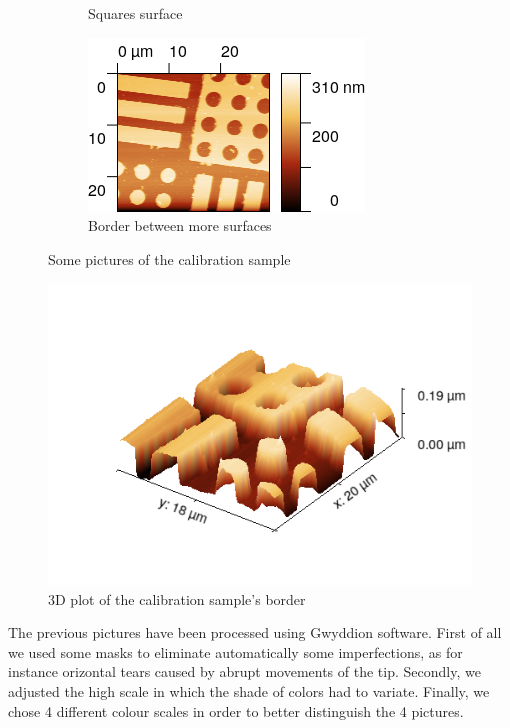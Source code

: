 \documentclass[11pt,a4paper]{article}
\begin{document}
\begin{figure}[H]
\begin{subfigure}[b]{0.45\textwidth}
\caption{Squares surface}
\label{fig:sm_squares}
\end{subfigure}
\begin{subfigure}[b]{0.45\textwidth}
\includegraphics[width=\textwidth]{sm_border}
\caption{Border between more surfaces}
\label{fig:sm_border}
\end{subfigure}
\caption{Some pictures of the calibration sample}
\end{figure}

\begin{figure}[ht]
\centering
\includegraphics[scale=0.47]{sm_border_3D}
\caption{3D plot of the calibration sample's border}
\label{fig: cal sam border}
\end{figure}

The previous pictures have been processed using Gwyddion software. First of all we used some masks to eliminate automatically some imperfections, as for instance orizontal tears caused by abrupt movements of the tip. Secondly, we adjusted the high scale in which the shade of colors had to variate. Finally, we chose 4 different colour scales in order to better distinguish the 4 pictures.
\end{document}
